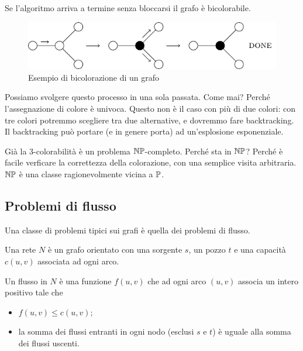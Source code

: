 Se l'algoritmo arriva a termine senza bloccarsi il grafo è bicolorabile.

\begin{figure}[h]
    \begin{center}
        \includegraphics{img/2Coloration.pdf}
    \end{center}
    \caption{Esempio di bicolorazione di un grafo}
\end{figure}

Possiamo svolgere questo processo in una sola passata. Come mai? Perché l'assegnazione di colore è
univoca. Questo non è il caso con più di due colori: con tre colori potremmo scegliere tra due
alternative, e dovremmo fare backtracking. Il backtracking può portare (e in genere porta) ad
un'esplosione esponenziale.

Già la 3-colorabilità è un problema $\mathbb{NP}$-completo. Perché sta in $\mathbb{NP}$? Perché è
facile verficare la correttezza della colorazione, con una semplice visita arbitraria. $\mathbb{NP}$ è
una classe ragionevolmente vicina a $\mathbb{P}$.

\subsection{Problemi di flusso}

Una classe di problemi tipici sui grafi è quella dei problemi di flusso.

\begin{defn}
    Una rete $N$ è un grafo orientato con una sorgente $s$, un pozzo $t$ e una capacità $c(u,v)$
    associata ad ogni arco.
\end{defn}

\begin{defn}
    Un flusso in $N$ è una funzione $f(u,v)$ che ad ogni arco $(u,v)$ associa un intero positivo
    tale che
    \begin{itemize}
        \item $f(u,v) \leq c(u,v)$;
        \item la somma dei flussi entranti in ogni nodo (esclusi $s$ e $t$) è uguale alla
        somma dei flussi uscenti.
    \end{itemize}
\end{defn}

